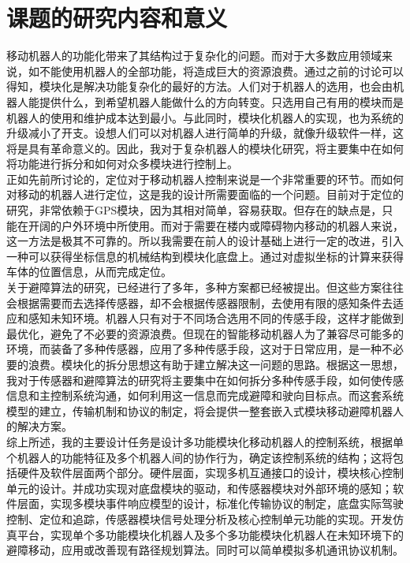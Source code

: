 \section{课题的研究内容和意义}
移动机器人的功能化带来了其结构过于复杂化的问题。而对于大多数应用领域来说，如不能使用机器人的全部功能，将造成巨大的资源浪费。通过之前的讨论可以得知，模块化是解决功能复杂化的最好的方法。人们对于机器人的选用，也会由机器人能提供什么，到希望机器人能做什么的方向转变。只选用自己有用的模块而是机器人的使用和维护成本达到最小。与此同时，模块化机器人的实现，也为系统的升级减小了开支。设想人们可以对机器人进行简单的升级，就像升级软件一样，这将是具有革命意义的。因此，我对于复杂机器人的模块化研究，将主要集中在如何将功能进行拆分和如何对众多模块进行控制上。 \\
正如先前所讨论的，定位对于移动机器人控制来说是一个非常重要的环节。而如何对移动的机器人进行定位，这是我的设计所需要面临的一个问题。目前对于定位的研究，非常依赖于GPS模块，因为其相对简单，容易获取。但存在的缺点是，只能在开阔的户外环境中所使用。而对于需要在楼内或障碍物内移动的机器人来说，这一方法是极其不可靠的。所以我需要在前人的设计基础上进行一定的改进，引入一种可以获得坐标信息的机械结构到模块化底盘上。通过对虚拟坐标的计算来获得车体的位置信息，从而完成定位。 \\
关于避障算法的研究，已经进行了多年，多种方案都已经被提出。但这些方案往往会根据需要而去选择传感器，却不会根据传感器限制，去使用有限的感知条件去适应和感知未知环境。机器人只有对于不同场合选用不同的传感手段，这样才能做到最优化，避免了不必要的资源浪费。但现在的智能移动机器人为了兼容尽可能多的环境，而装备了多种传感器，应用了多种传感手段，这对于日常应用，是一种不必要的浪费。模块化的拆分思想这有助于建立解决这一问题的思路。根据这一思想，我对于传感器和避障算法的研究将主要集中在如何拆分多种传感手段，如何使传感信息和主控制系统沟通，如何利用这一信息而完成避障和驶向目标点。而这套系统模型的建立，传输机制和协议的制定，将会提供一整套嵌入式模块移动避障机器人的解决方案。  \\
综上所述，我的主要设计任务是设计多功能模块化移动机器人的控制系统，根据单个机器人的功能特征及多个机器人间的协作行为，确定该控制系统的结构；这将包括硬件及软件层面两个部分。硬件层面，实现多机互通接口的设计，模块核心控制单元的设计。并成功实现对底盘模块的驱动，和传感器模块对外部环境的感知；软件层面，实现多模块事件响应模型的设计，标准化传输协议的制定，底盘实际驾驶控制、定位和追踪，传感器模块信号处理分析及核心控制单元功能的实现。开发仿真平台，实现单个多功能模块化机器人及多个多功能模块化机器人在未知环境下的避障移动，应用或改善现有路径规划算法。同时可以简单模拟多机通讯协议机制。 \\


